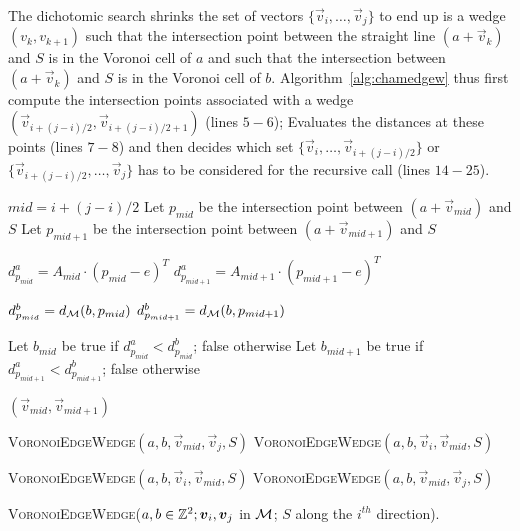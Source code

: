 \documentclass{llncs}
\begin{document}
The dichotomic search shrinks the set of vectors
$\{\vec{v}_i,\ldots,\vec{v}_j\}$ to end up is a wedge $(v_k,v_{k+1})$
such that the intersection point between the straight line $(a +
\vec{v}_k)$ and $S$ is in the Voronoi cell of $a$ and such that the
intersection between $(a + \vec{v}_k)$ and $S$ is in the Voronoi cell
of $b$. Algorithm~\ref{alg:chamedgew} thus first compute the
intersection points associated with a wedge $(\vec{v}_{i+(j-i)/2},
\vec{v}_{i+(j-i)/2+1})$ (lines $5-6$); Evaluates the distances at
these points (lines $7-8$) and then decides which set
$\{\vec{v}_i,\ldots,\vec{v}_{i+(j-i)/2}\}$ or
$\{\vec{v}_{i+(j-i)/2},\ldots,\vec{v}_j\}$ has to be considered for
the recursive call (lines $14-25$).

\begin{algorithm}
\footnotesize
{
   $mid  = i + (j-i)/2$\;
   Let $p_{mid}$  be the intersection point between $(a +
   \vec{v}_{mid})$ and $S$\;
  Let $p_{mid+1}$  be the intersection point between $(a +
   \vec{v}_{mid+1})$ and $S$\;


   $d^a_{p_{mid}} = A_{mid}\cdot (p_{mid}-e)^T$\;
   $d^a_{p_{mid+1}} = A_{mid+1}\cdot (p_{mid+1}-e)^T$\;


   $d^b_{p_{mid}} = d_{\mathcal{M}}(b, p_{mid})$\;
   $d^b_{p_{mid+1}} = d_{\mathcal{M}}(b,p_{mid+1})$\;

   Let $b_{mid}$ be true if $d^a_{p_{mid}} < d^b_{p_{mid}}$; false otherwise\;
   Let $b_{mid+1}$ be true if $d^a_{p_{mid+1}} < d^b_{p_{mid+1}}$; false otherwise\;


    { \Return $(\vec{v}_{mid},\vec{v}_{mid+1})$\; }

{
{
  \Return \textsc{VoronoiEdgeWedge}$(a,b,\vec{v}_{mid}, \vec{v}_{j}, S)$\;
}
{
  \Return \textsc{VoronoiEdgeWedge}$(a,b,\vec{v}_{i}, \vec{v}_{mid}, S)$\;
}

}
{
{
  \Return \textsc{VoronoiEdgeWedge}$(a,b,\vec{v}_{i}, \vec{v}_{mid}, S)$\;
}
{
  \Return \textsc{VoronoiEdgeWedge}$(a,b,\vec{v}_{mid}, \vec{v}_{j}, S)$\;
}

}

}
  \caption{\textsc{VoronoiEdgeWedge}($a,b\in\Z^2; \vec{v}_i,\vec{v}_j$
    in $\mathcal{M}$; $S$ along the $i^{th}$ direction).\label{alg:chamedgew}}
\end{algorithm}
\end{document}
